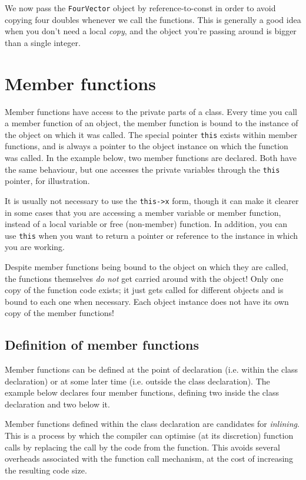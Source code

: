 \documentclass[a4paper]{scrartcl}
\begin{document}


We now pass the \verb|FourVector| object by reference-to-const in order to avoid copying four doubles whenever we call the functions. This is generally a good idea when you don't need a local \emph{copy}, and the object you're passing around is bigger than a single integer.

\section{Member functions}
Member functions have access to the private parts of a class. Every time you call a member function of an object, the member function is bound to the instance of the object on which it was called. The special pointer \verb|this| exists within member functions, and is always a pointer to the object instance on which the function was called. In the example below, two member functions are declared. Both have the same behaviour, but one accesses the private variables through the \verb|this| pointer, for illustration.



It is usually not necessary to use the \verb|this->x| form, though it can make it clearer in some cases that you are accessing a member variable or member function, instead of a local variable or free (non-member) function. In addition, you can use \verb|this| when you want to return a pointer or reference to the instance in which you are working.

Despite member functions being bound to the object on which they are called, the functions themselves \emph{do not} get carried around with the object! Only one copy of the function code exists; it just gets called for different objects and is bound to each one when necessary. Each object instance does not have its own copy of the member functions!

\subsection{Definition of member functions}
Member functions can be defined at the point of declaration (i.e. within the class declaration) or at some later time (i.e. outside the class declaration). The example below declares four member functions, defining two inside the class declaration and two below it.



Member functions defined within the class declaration are candidates for \emph{inlining}. This is a process by which the compiler can optimise (at its discretion) function calls by replacing the call by the code from the function. This avoids several overheads associated with the function call mechanism, at the cost of increasing the resulting code size.
\end{document}
